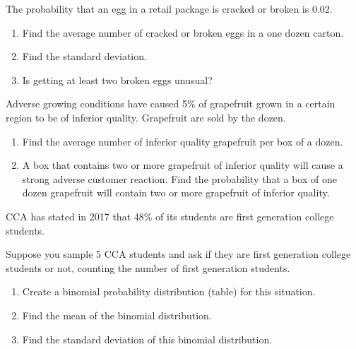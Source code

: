 \begin{example}

The probability that an egg in a retail package is cracked or broken is
0.02.

\begin{enumerate}
\item
  Find the average number of cracked or broken eggs in a one dozen
  carton.
\item
  Find the standard deviation.
\item
  Is getting at least two broken eggs unusual?
\end{enumerate}

\end{example}

\begin{exercise}

Adverse growing conditions have caused 5\% of grapefruit grown in a
certain region to be of inferior quality. Grapefruit are sold by the
dozen.

\begin{enumerate}
\item
  Find the average number of inferior quality grapefruit per box of a
  dozen.
\item
  A box that contains two or more grapefruit of inferior quality will
  cause a strong adverse customer reaction. Find the probability that a
  box of one dozen grapefruit will contain two or more grapefruit of
  inferior quality.
\end{enumerate}

\end{exercise}

\begin{exercise}

CCA has stated in 2017 that 48\% of its students are first generation
college students.

Suppose you sample 5 CCA students and ask if they are first generation
college students or not, counting the number of first generation
students.

\begin{enumerate}
\item
  Create a binomial probability distribution (table) for this situation.
\item
  Find the mean of the binomial distribution.
\item
  Find the standard deviation of this binomial distribution.
\end{enumerate}

\end{exercise}

